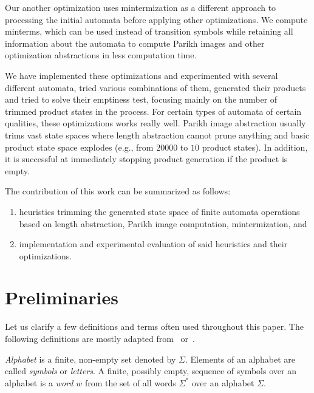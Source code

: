 
Our another optimization uses mintermization as a different approach to processing the initial automata before applying other optimizations. We compute minterms, which can be used instead of transition symbols while retaining all information about the automata to compute Parikh images and other optimization abstractions in less computation time.


We have implemented these optimizations and experimented with several different automata, tried various combinations of them, generated their products and tried to solve their emptiness test, focusing mainly on the number of trimmed product states in the process. For certain types of automata of certain qualities, these optimizations works really well. Parikh image abstraction usually trims vast state spaces where length abstraction cannot prune anything and basic product state space explodes (e.g., from $20000$ to $10$ product states). In addition, it is successful at immediately stopping product generation if the product is empty.

The contribution of this work can be summarized as follows:
\begin{enumerate}
    \item heuristics trimming the generated state space of finite automata operations based on length abstraction, Parikh image computation, mintermization, and
    \item implementation and experimental evaluation of said heuristics and their optimizations.
\end{enumerate}


\chapter{Preliminaries}

Let us clarify a few definitions and terms often used throughout this paper. The following definitions are mostly adapted from~\cite{Esparza} or~\cite{Sipser}.

\emph{Alphabet} is a finite, non-empty set denoted by $\Sigma$. Elements of an alphabet are called \emph{symbols} or \emph{letters}. A finite, possibly empty, sequence of symbols over an alphabet is a \emph{word} $w$ from the set of all words $\Sigma^*$ over an alphabet $\Sigma$.

